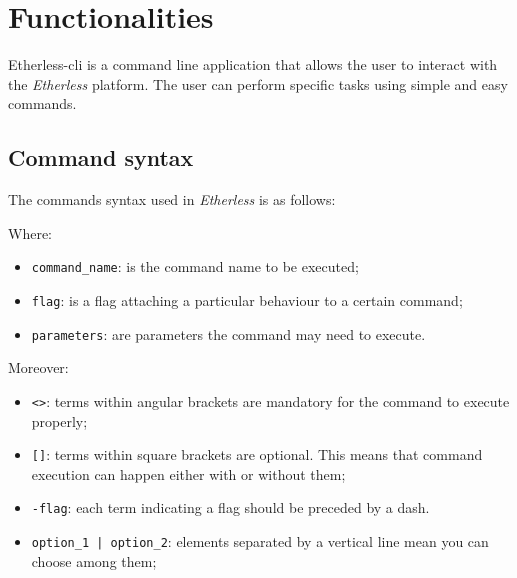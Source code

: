 \section{Functionalities}
Etherless-cli is a command line application that allows the user to interact with the \textit{Etherless} platform. The user can perform specific tasks using simple and easy commands.

\subsection{Command syntax}
The commands syntax used in \textit{Etherless} is as follows:
\begin{center}
\end{center}
Where:
\begin{itemize}
	\item \texttt{command\_name}: is the command name to be executed;
	\item \texttt{flag}: is a flag attaching a particular behaviour to a certain command;
	\item \texttt{parameters}: are parameters the command may need to execute.
\end{itemize}
Moreover:
\begin{itemize}
	\item \texttt{<>}: terms within angular brackets are mandatory for the command to execute properly;
	\item \texttt{[]}: terms within square brackets are optional. This means that command execution can happen either with or without them;
	\item \texttt{-flag}: each term indicating a flag should be preceded by a dash.
	\item \texttt{option\_1 | option\_2}: elements separated by a vertical line mean you can choose among them;
\end{itemize}

